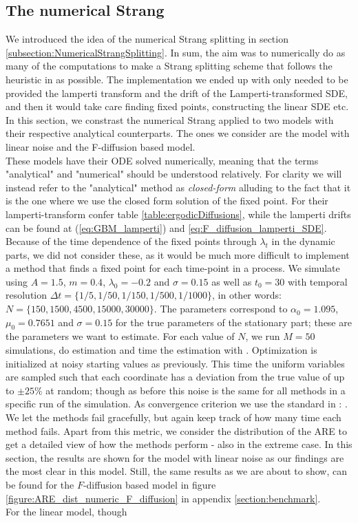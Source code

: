 \subsection{The numerical Strang}
We introduced the idea of the numerical Strang splitting in section \ref{subsection:NumericalStrangSplitting}. In sum, the aim was to numerically do as many of the computations to make a Strang splitting scheme that follows the heuristic in \cite{SplittingSchemes} as possible. The implementation we ended up with only needed to be provided the lamperti transform and the drift of the Lamperti-transformed SDE, and then it would take care finding fixed points, constructing the linear SDE etc. In this section, we constrast the numerical Strang applied to two models with their respective analytical counterparts. The ones we consider are the model with linear noise and the F-diffusion based model. \\These models have their ODE solved numerically, meaning that the terms "analytical" and "numerical" should be understood relatively. For clarity we will instead refer to the "analytical" method as \textit{closed-form} alluding to the fact that it is the one where we use the closed form solution of the fixed point. For their lamperti-transform confer table \ref{table:ergodicDiffusions}, while the lamperti drifts can be found at (\ref{eq:GBM_lamperti}) and \ref{eq:F_diffusion_lamperti_SDE}. Because of the time dependence of the fixed points through $\lambda_t$ in the dynamic parts, we did not consider these, as it would be much more difficult to implement a method that finds a fixed point for each time-point in a process. We simulate using $A = 1.5$, $m=0.4$, $\lambda_0 = -0.2$ and $\sigma =0.15$ as well as $t_0 = 30$ with temporal resolution $\Delta t = \{1/5, 1/50, 1/150, 1/500, 1/1000\}$, in other words: $N =  \{150, 1500, 4500, 15000, 30000\}$.  The parameters correspond to $\alpha_0 = 1.095$, $\mu_0 = 0.7651$ and $\sigma = 0.15$ for the true parameters of the stationary part; these are the parameters we want to estimate. For each value of $N$, we run $M = 50$ simulations, do estimation and time the estimation with . Optimization is initialized at noisy starting values as previously. This time the uniform variables are sampled such that each coordinate has a deviation from the true value of up to $\pm 25\%$ at random; though as before this noise is the same for all methods in a specific run of the simulation. As convergence criterion we use the standard in : . We let the methods fail gracefully, but again keep track of how many time each method fails. Apart from this metric, we consider the distribution of the ARE to get a detailed view of how the methods perform - also in the extreme case. In this section, the results are shown for the model with linear noise as our findings are the most clear in this model. Still, the same results as we are about to show, can be found for the $F$-diffusion based model in figure \ref{figure:ARE_dist_numeric_F_diffusion} in appendix \ref{section:benchmark}. \\For the linear model, though
